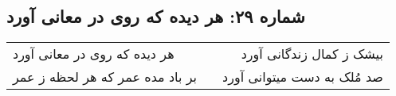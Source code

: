 \begin{center}
\section*{شماره ۲۹: هر دیده که روی در معانی آورد}
\label{sec:029}
\begin{longtable}{l p{0.5cm} r}
هر دیده که روی در معانی آورد
&&
بیشک ز کمال زندگانی آورد
\\
بر باد مده عمر که هر لحظه ز عمر
&&
صد مُلک به دست میتوانی آورد
\\
\end{longtable}
\end{center}
